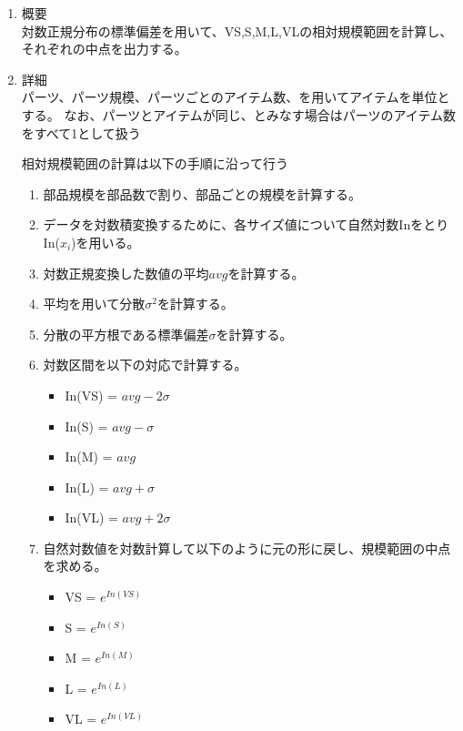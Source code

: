 \documentclass[titlepage,a4paper,12pt]{ltjsreport}
\begin{document}

\begin{enumerate}
    \item 概要 \mbox{}\\
    対数正規分布の標準偏差を用いて、VS,S,M,L,VLの相対規模範囲を計算し、それぞれの中点を出力する。

    \item 詳細\mbox{}\\
    パーツ、パーツ規模、パーツごとのアイテム数、を用いてアイテムを単位とする。
    なお、パーツとアイテムが同じ、とみなす場合はパーツのアイテム数をすべて1として扱う

    相対規模範囲の計算は以下の手順に沿って行う

    \begin{enumerate}
        \item 部品規模を部品数で割り、部品ごとの規模を計算する。
        \item データを対数積変換するために、各サイズ値について自然対数InをとりIn($x_i$)を用いる。
        \item 対数正規変換した数値の平均$avg$を計算する。
        \item 平均を用いて分散$\sigma^2$を計算する。
        \item 分散の平方根である標準偏差$\sigma$を計算する。
        \item 対数区間を以下の対応で計算する。
        
        \begin{itemize}
            \item In(VS) = $avg - 2\sigma$
            \item In(S) = $avg - \sigma$
            \item In(M) = $avg$
            \item In(L) = $avg + \sigma$
            \item In(VL) = $avg + 2\sigma$
        \end{itemize}

        \item 自然対数値を対数計算して以下のように元の形に戻し、規模範囲の中点を求める。
        
        \begin{itemize}
            \item VS = $e^{In(VS)}$
            \item S = $e^{In(S)}$
            \item M = $e^{In(M)}$
            \item L = $e^{In(L)}$
            \item VL = $e^{In(VL)}$
        \end{itemize}


\end{enumerate}
\end{enumerate}
\end{document}

